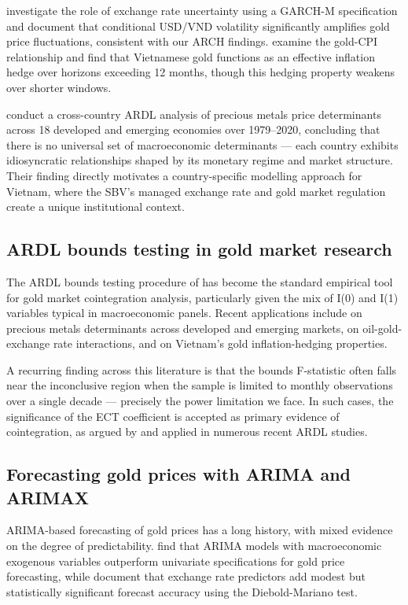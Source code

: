 \documentclass[12pt,a4paper]{article}
\begin{document}
\citet{nguyen2020} investigate the role of exchange rate uncertainty using
a GARCH-M specification and document that conditional USD/VND volatility
significantly amplifies gold price fluctuations, consistent with our
ARCH findings. \citet{tran2021} examine the gold-CPI relationship and
find that Vietnamese gold functions as an effective inflation hedge over
horizons exceeding 12 months, though this hedging property weakens over
shorter windows.

\citet{rana2023} conduct a cross-country ARDL analysis of precious metals
price determinants across 18 developed and emerging economies over
1979--2020, concluding that there is no universal set of macroeconomic
determinants --- each country exhibits idiosyncratic relationships shaped
by its monetary regime and market structure. Their finding directly
motivates a country-specific modelling approach for Vietnam, where the SBV's
managed exchange rate and gold market regulation create a unique
institutional context.

\subsection{ARDL bounds testing in gold market research}

The ARDL bounds testing procedure of \citet{pesaran2001} has become the
standard empirical tool for gold market cointegration analysis, particularly
given the mix of I(0) and I(1) variables typical in macroeconomic panels.
Recent applications include \citet{rana2023} on precious metals determinants
across developed and emerging markets, \citet{salisu2021} on oil-gold-exchange
rate interactions, and \citet{do2023} on Vietnam's gold inflation-hedging
properties.

A recurring finding across this literature is that the bounds F-statistic
often falls near the inconclusive region when the sample is limited to
monthly observations over a single decade --- precisely the power limitation
we face. In such cases, the significance of the ECT coefficient is accepted
as primary evidence of cointegration, as argued by \citet{kremers1992} and
applied in numerous recent ARDL studies.

\subsection{Forecasting gold prices with ARIMA and ARIMAX}

ARIMA-based forecasting of gold prices has a long history, with mixed
evidence on the degree of predictability. \citet{tully2007} find that
ARIMA models with macroeconomic exogenous variables outperform univariate
specifications for gold price forecasting, while \citet{pierdzioch2016}
document that exchange rate predictors add modest but statistically
significant forecast accuracy using the Diebold-Mariano test.
\end{document}
